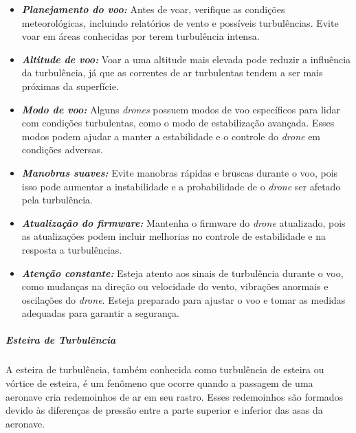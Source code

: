 \documentclass[a4paper, 12pt, onecolumn,singlespacing]{article}
\begin{document}
	\begin{itemize}
		\item \textbf{\textit{Planejamento do voo:}} Antes de voar, verifique as condições meteorológicas, incluindo relatórios de vento e possíveis turbulências. Evite voar em áreas conhecidas por terem turbulência intensa.
		
		\item \textbf{\textit{Altitude de voo:}} Voar a uma altitude mais elevada pode reduzir a influência da turbulência, já que as correntes de ar turbulentas tendem a ser mais próximas da superfície.
		
		\item \textbf{\textit{Modo de voo:}} Alguns \textit{drones} possuem modos de voo específicos para lidar com condições turbulentas, como o modo de estabilização avançada. Esses modos podem ajudar a manter a estabilidade e o controle do \textit{drone} em condições adversas.
		
		\item \textbf{\textit{Manobras suaves:}} Evite manobras rápidas e bruscas durante o voo, pois isso pode aumentar a instabilidade e a probabilidade de o \textit{drone} ser afetado pela turbulência.
		
		\item \textbf{\textit{Atualização do firmware:}} Mantenha o firmware do \textit{drone} atualizado, pois as atualizações podem incluir melhorias no controle de estabilidade e na resposta a turbulências.
		
		\item \textbf{\textit{Atenção constante:}} Esteja atento aos sinais de turbulência durante o voo, como mudanças na direção ou velocidade do vento, vibrações anormais e oscilações do \textit{drone}. Esteja preparado para ajustar o voo e tomar as medidas adequadas para garantir a segurança.
		
	\end{itemize}

	\subparagraph{Esteira de Turbulência}

	A esteira de turbulência, também conhecida como turbulência de esteira ou vórtice de esteira, é um fenômeno que ocorre quando a passagem de uma aeronave cria redemoinhos de ar em seu rastro. Esses redemoinhos são formados devido às diferenças de pressão entre a parte superior e inferior das asas da aeronave.
	
\end{document}
